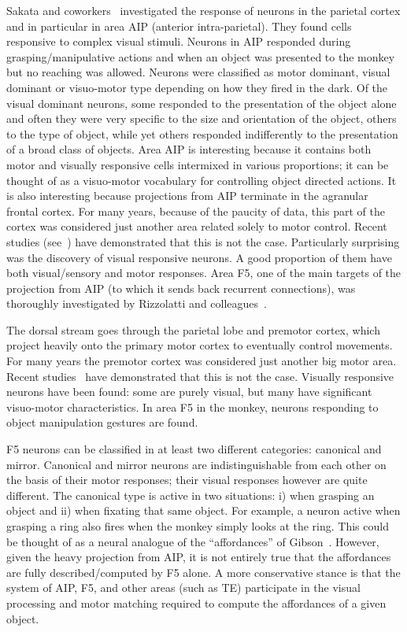 Sakata and coworkers~\cite{sakata-taira-kusunoki-murata-tanaka-1997} 
investigated the response of neurons in the 
parietal cortex and in particular in area AIP (anterior intra-parietal). They found 
cells responsive to complex visual stimuli. Neurons in AIP responded during 
grasping/manipulative actions and when an object was presented to the 
monkey but no reaching was allowed. Neurons were classified as motor dominant, 
visual dominant or visuo-motor type depending on how they fired in the dark. Of 
the visual dominant neurons, some responded to the presentation of the 
object alone and often they were very specific to the size and orientation of the 
object, others to the type of object, while yet others responded indifferently to the 
presentation of a broad class of objects. Area AIP is interesting because 
it contains both motor and visually responsive cells intermixed in various proportions; 
it can be thought of as a visuo-motor vocabulary for controlling object directed 
actions. It is also interesting because projections from AIP terminate in the 
agranular frontal cortex. For many years, because of the paucity of data, this 
part of the cortex was considered just another area related solely to motor control. Recent studies 
(see~\cite{jeannerod97cognitive,fadiga00visuomotor}) have demonstrated 
that this is not the case. Particularly surprising was the discovery of visual 
responsive neurons. A good proportion of them have both visual/sensory and motor 
responses. Area F5, one of the main targets of the projection from AIP (to which 
it sends back recurrent connections), was thoroughly investigated by Rizzolatti 
and colleagues~\cite{gallese-fadiga-fogassi-rizzolatti-1996}.

%
%
\ifverbose
The dorsal stream goes through the parietal lobe and premotor cortex,
which project heavily onto the primary motor cortex to eventually
control movements. For many years the premotor cortex was considered
just another big motor area.  Recent studies~\cite{jeannerod97cognitive} have demonstrated that this is not the
case.  Visually responsive neurons have been found: some are purely
visual, but many have significant visuo-motor characteristics. In area
F5 in the monkey, neurons responding to object manipulation gestures
are found.  
\fi

F5 neurons can be classified in at least two different categories:
canonical and mirror.
Canonical and mirror neurons are 
indistinguishable from each other on the basis of their motor responses; 
their visual responses however are quite different. 
The canonical type is active in two situations:
i) when grasping an object and ii) when fixating that same object.
For example, a neuron active when grasping a ring also fires when the
monkey simply looks at the ring.  This could be thought of as a neural
analogue of the ``affordances'' of Gibson~\cite{gibson77theory}. 
However, given the heavy projection from AIP, it is not entirely
true that the affordances are fully described/computed by F5 alone.
A more conservative stance is that the system of AIP, F5, and other areas 
(such as TE) participate in the visual processing and motor matching required 
to compute the affordances of a given object.  

